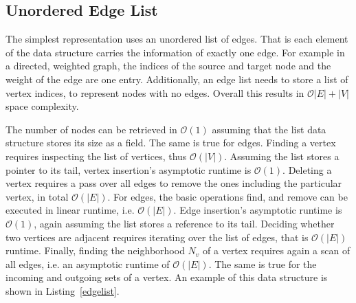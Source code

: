         \subsection*{Unordered Edge List}
            The simplest representation uses an unordered list of edges. 
            That is each element of the data structure carries the information of exactly one edge. 
            For example in a directed, weighted graph, the indices of the source and target node and the weight of the edge are one entry. 
            Additionally, an edge list needs to store a list of vertex indices, to represent nodes with no edges.
            Overall this results in $\mathcal{O}|E| + |V|$ space complexity.
            
            The number of nodes can be retrieved in $\mathcal{O}(1)$ assuming that the list data structure stores its size as a field. 
            The same is true for edges.
            Finding a vertex requires inspecting the list of vertices, thus $\mathcal{O}(|V|)$. 
            Assuming the list stores a pointer to its tail, vertex insertion's asymptotic runtime is $\mathcal{O}(1)$. 
            Deleting a vertex requires a pass over all edges to remove the ones including the particular vertex, in total $\mathcal{O}(|E|)$.
            For edges, the basic operations find, and remove can be executed in linear runtime, i.e. $\mathcal{O}(|E|)$.
            Edge insertion's asymptotic runtime is $\mathcal{O}(1)$, again assuming the list stores a reference to its tail. 
            Deciding whether two vertices are adjacent requires iterating over the list of edges, that is 
            $\mathcal{O}(|E|)$ runtime.
            Finally, finding the neighborhood $N_v$ of a vertex requires again a scan of all edges, i.e. an asymptotic runtime of $\mathcal{O}(|E|)$. 
            The same is true for the incoming and outgoing sets of a vertex.
            An example of this data structure is shown in Listing~\ref{edgelist}.
            
